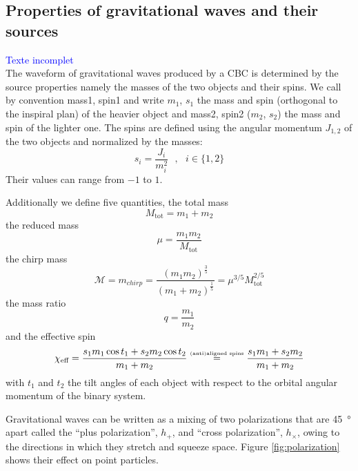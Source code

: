 \subsection{Properties of gravitational waves and their sources}

\textcolor{blue}{Texte incomplet}\\
The waveform of gravitational waves produced by a CBC is determined by the source properties namely the masses of the two objects and their spins.
We call by convention mass1, spin1 and write $m_1$, $s_1$ the mass and spin (orthogonal to the inspiral plan) of the heavier object and mass2, spin2 ($m_2$, $s_2$) the mass and spin of the lighter one.
The spins are defined using the angular momentum $J_{1,2}$ of the two objects and normalized by the masses:
\begin{equation}
  s_i = \frac{J_i}{m^2_i} \text{  }, \text{  } i \in \{1,2\}
  \label{eq:spin}
\end{equation}
Their values can range from $-1$ to $1$.

Additionally we define five quantities, the total mass
%
\begin{equation}
  M_{\textrm{tot}} = m_1 + m_2
\end{equation}
%
the reduced mass
%
\begin{equation}
  \mu = \frac{m_1 m_2}{M_{\textrm{tot}}}
\end{equation}
%
the chirp mass
%
\begin{equation}
  \mathcal{M} = m_{chirp} = \frac{ \left( m_1m_2 \right)^{\frac{3}{5}} }{ \left( m_1 + m_2 \right)^{\frac{1}{5}} } = \mu^{3/5}M_{\textrm{tot}}^{2/5}
  \label{eq:mchirp}
\end{equation}
%
the mass ratio
%
\begin{equation}
  q=\frac{m_1}{m_2}
\end{equation}
%
and the effective spin
%
\begin{equation}
  \chi_{\textrm{eff}} = \frac{s_1m_1\cos t_1 + s_2m_2\cos t_2}{m_1 + m_2} \stackrel{\textrm{\tiny (anti)aligned spins}}{=} \frac{s_1 m_1 + s_2 m _2}{m_1 + m_2}
  \label{eq:spin_eff}
\end{equation}
%
with $t_1$ and $t_2$ the tilt angles of each object with respect to the orbital angular momentum of the binary system.

%
Gravitational waves can be written as a mixing of two polarizations that are \SI{45}{\degree} apart \cite{polarization} called the ``plus polarization'', $h_+$, and ``cross polarization'', $h_\times$, owing to the directions in which they stretch and squeeze space.
Figure \ref{fig:polarization} shows their effect on point particles.

